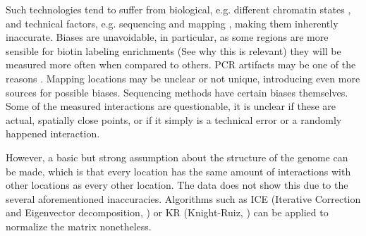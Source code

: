 Such technologies tend to suffer from biological, e.g. different chromatin
states \cite{pmid19693276}, and technical factors, e.g. sequencing and mapping
\cite{pmid21646344}, making them inherently inaccurate. Biases are unavoidable,
in particular, as some regions are more sensible for biotin labeling
enrichments (See  why this is relevant) they will be
measured more often when compared to others. PCR artifacts may be one of the
reasons \cite{wingett2015hicup}. Mapping locations may be unclear or not
unique, introducing even more sources for possible biases. Sequencing methods
have certain biases themselves. Some of the measured interactions are
questionable, it is unclear if these are actual, spatially close points, or if
it simply is a technical error or a randomly happened interaction.

However, a basic but strong assumption about the structure of the genome can be
made, which is that every location has the same amount of interactions with
other locations as every other location. The data does not show this due to
the several aforementioned inaccuracies. Algorithms such as ICE
\cite{imakaev2012iterative} (Iterative Correction and Eigenvector
decomposition, ) or KR \cite{knight2013fast} (Knight-Ruiz,
) can be applied to normalize the matrix nonetheless.



